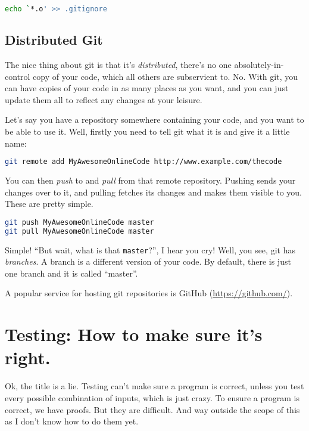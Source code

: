 \documentclass[12pt,a4paper]{article}
\begin{document}
\begin{lstlisting}[language=bash]
echo `*.o' >> .gitignore
\end{lstlisting}

\subsection{Distributed Git}

The nice thing about git is that it's \textit{distributed}, there's no
one absolutely-in-control copy of your code, which all others are
subservient to. No. With git, you can have copies of your code in as
many places as you want, and you can just update them all to reflect
any changes at your leisure.

Let's say you have a repository somewhere containing your code, and
you want to be able to use it. Well, firstly you need to tell git what
it is and give it a little name:

\begin{lstlisting}[language=bash]
git remote add MyAwesomeOnlineCode http://www.example.com/thecode
\end{lstlisting}

You can then \textit{push} to and \textit{pull} from that remote
repository. Pushing sends your changes over to it, and pulling fetches
its changes and makes them visible to you. These are pretty simple.

\begin{lstlisting}[language=bash]
git push MyAwesomeOnlineCode master
git pull MyAwesomeOnlineCode master
\end{lstlisting}

Simple! ``But wait, what is that \texttt{master}?'', I hear you cry!
Well, you see, git has \textit{branches}. A branch is a different
version of your code. By default, there is just one branch and it is
called ``master''.

A popular service for hosting git repositories is GitHub (\url{https://github.com/}).

\pagebreak
\section{Testing: How to make sure it's right.}

Ok, the title is a lie. Testing can't make sure a program is correct,
unless you test every possible combination of inputs, which is just
crazy. To ensure a program is correct, we have proofs. But they are
difficult. And way outside the scope of this as I don't know how to do
them yet.
\end{document}
